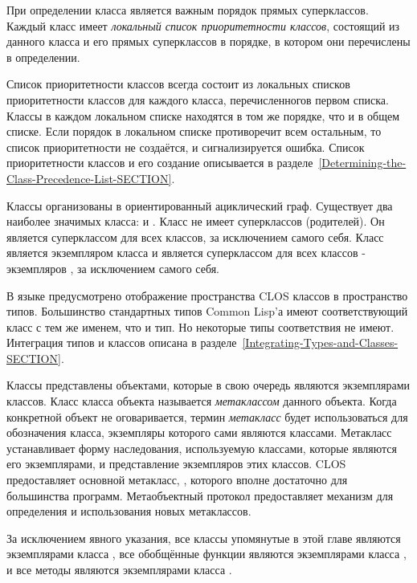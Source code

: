 При определении класса является важным порядок прямых суперклассов. Каждый класс
имеет \emph{локальный список приоритетности классов}, состоящий из данного класса
и его прямых суперклассов в порядке, в котором они перечислены в определении.

Список приоритетности классов всегда состоит из локальных списков приоритетности
классов для каждого класса, перечисленногов первом списка. Классы в каждом
локальном списке находятся в том же порядке, что и в общем списке. Если порядок
в локальном списке противоречит всем остальным, то список приоритетности не
создаётся, и сигнализируется ошибка.  Список приоритетности классов и его
создание описывается в
разделе~\ref{Determining-the-Class-Precedence-List-SECTION}.

Классы организованы в ориентированный ациклический граф. Существует два наиболее
значимых класса:  и . Класс  не имеет
суперклассов (родителей). Он является суперклассом для всех классов, за
исключением самого себя. Класс  является экземпляром класса
 и является суперклассом для всех классов - экземпляров
, за исключением самого себя.

В языке предусмотрено отображение пространства CLOS классов в пространство
типов. Большинство стандартных типов Common Lisp'а имеют соответствующий класс с
тем же именем, что и тип. Но некоторые типы соответствия не имеют. Интеграция
типов и классов описана в разделе~\ref{Integrating-Types-and-Classes-SECTION}.

Классы представлены объектами, которые в свою очередь являются экземплярами
классов. Класс класса объекта называется \emph{метаклассом} данного
объекта. Когда конкретной объект не оговаривается, термин \emph{метакласс} будет
использоваться для обозначения класса, экземпляры которого сами являются
классами.  
Метакласс устанавливает форму наследования, используемую классами,
которые являются его экземплярами, и представление экземпляров этих классов.
CLOS предоставляет основной метакласс, , которого вполне
достаточно для большинства программ. Метаобъектный протокол предоставляет
механизм для определения и использования новых метаклассов.

За исключением явного указания, все классы упомянутые в этой главе являются
экземплярами класса , все обобщённые функции являются
экземплярами класса , и все методы являются
экземплярами класса .

